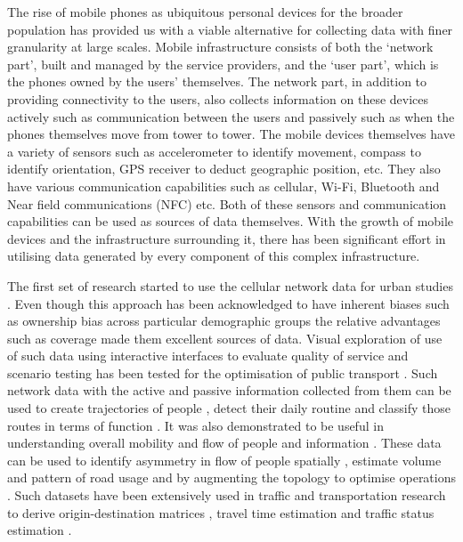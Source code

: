 The rise of mobile phones as ubiquitous personal devices for the broader population has provided us with a viable alternative for collecting data with finer granularity at large scales.
Mobile infrastructure consists of both the `network part’, built and managed by the service providers, and the `user part’, which is the phones owned by the users’ themselves.
The network part, in addition to providing connectivity to the users, also collects information on these devices actively such as communication between the users and passively such as when the phones themselves move from tower to tower.
The mobile devices themselves have a variety of sensors such as accelerometer to identify movement, compass to identify orientation, GPS receiver to deduct geographic position, etc.
They also have various communication capabilities such as cellular, Wi-Fi, Bluetooth and Near field communications (NFC) etc. 
Both of these sensors and communication capabilities can be used as sources of data themselves.
With the growth of mobile devices and the infrastructure surrounding it, there has been significant effort in utilising data generated by every component of this complex infrastructure.

The first set of research started to use the cellular network data for urban studies \citep{jiang2013,steenbruggen2015, lokanathan2015, calabrese2015, reades2007}.
Even though this approach has been acknowledged to have inherent biases such as ownership bias across particular demographic groups \citep{wesolowski2013} the relative advantages such as coverage made them excellent sources of data.
Visual exploration of use of such data using interactive interfaces to evaluate quality of service and scenario testing has been tested for the optimisation of public transport \cite[-4cm]{sbodio2014}.
Such network data with the active and passive information collected from them can be used to create trajectories of people \cite{schlaich2010}, detect their daily routine \cite[2cm]{sevtsuk2010} and classify those routes in terms of function \citep{becker2011a}.
It was also demonstrated to be useful in understanding overall mobility and flow of people and information \citep{candia2008, krings2009, simini2012, zhang2019}.
These data can be used to identify asymmetry in flow of people spatially \citep{phithakkitnukoon2011}, estimate volume and pattern of road usage \citep{bolla2000, wang2012} and by augmenting the topology to optimise operations \citep{puzis2013}.
Such datasets have been extensively used in traffic and transportation research to derive origin-destination matrices \citep{caceres2007, mellegard2011, iqbal2014}, travel time estimation \citep{janecek2012} and traffic status estimation \citep{demissie2013, grauwin2015}. 

